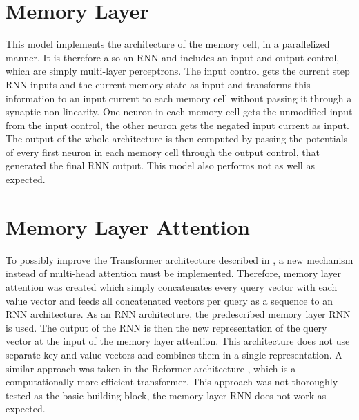 \documentclass[draft,final]{vutinfth} %
\begin{document}
    \section{Memory Layer} \label{Memory Layer}
    This model implements the architecture of the memory cell, in a parallelized manner. It is therefore also an RNN and includes an input and output control, which are simply multi-layer perceptrons.
    The input control gets the current step RNN inputs and the current memory state as input and transforms this information to an input current to each memory cell without passing it through a synaptic non-linearity.
    One neuron in each memory cell gets the unmodified input from the input control, the other neuron gets the negated input current as input.
    The output of the whole architecture is then computed by passing the potentials of every first neuron in each memory cell through the output control, that generated the final RNN output.
    This model also performs not as well as expected.


    \section{Memory Layer Attention} \label{Memory Layer Attention}
    To possibly improve the Transformer architecture described in \cite{Transformer}, a new mechanism instead of multi-head attention must be implemented.
    Therefore, memory layer attention was created which simply concatenates every query vector with each value vector and feeds all concatenated vectors per query as a sequence to an RNN architecture.
    As an RNN architecture, the predescribed memory layer RNN is used. The output of the RNN is then the new representation of the query vector at the input of the memory layer attention.
    This architecture does not use separate key and value vectors and combines them in a single representation.
    A similar approach was taken in the Reformer architecture \cite{Reformer}, which is a computationally more efficient transformer.
    This approach was not thoroughly tested as the basic building block, the memory layer RNN does not work as expected.
\end{document}
